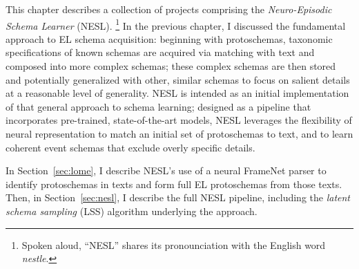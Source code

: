 This chapter describes a collection of projects comprising the \textit{Neuro-Episodic Schema Learner} (NESL). \footnote{Spoken aloud, ``NESL'' shares its pronounciation with the English word \textit{nestle}.} In the previous chapter, I discussed the fundamental approach to EL schema acquisition: beginning with protoschemas, taxonomic specifications of known schemas are acquired via matching with text and composed into more complex schemas; these complex schemas are then stored and potentially generalized with other, similar schemas to focus on salient details at a reasonable level of generality. NESL is intended as an initial implementation of that general approach to schema learning; designed as a pipeline that incorporates pre-trained, state-of-the-art models, NESL leverages the flexibility of neural representation to match an initial set of protoschemas to text, and to learn coherent event schemas that exclude overly specific details.

In Section~\ref{sec:lome}, I describe NESL's use of a neural FrameNet parser to identify protoschemas in texts and form full EL protoschemas from those texts. Then, in Section~\ref{sec:nesl}, I describe the full NESL pipeline, including the \textit{latent schema sampling} (LSS) algorithm underlying the approach.
